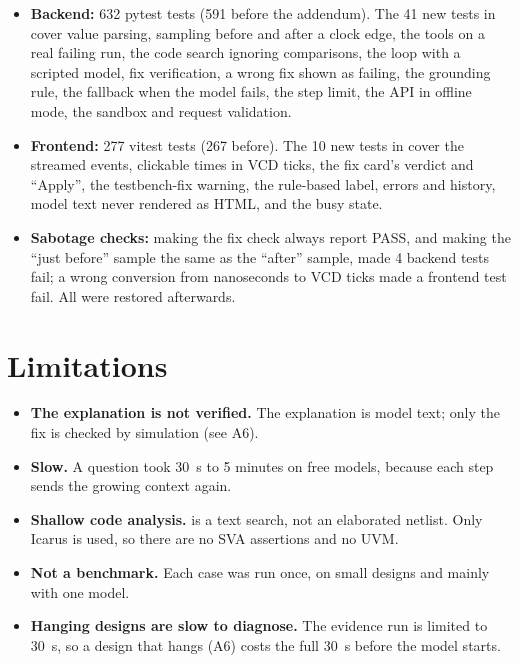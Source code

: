 \begin{itemize}
\item \textbf{Backend:} 632 pytest tests (591 before the addendum). The 41 new tests
in  cover value parsing, sampling before and after a clock
edge, the tools on a real failing run, the code search ignoring comparisons, the loop
with a scripted model, fix verification, a wrong fix shown as failing, the grounding
rule, the fallback when the model fails, the step limit, the API in offline mode, the
sandbox and request validation.
\item \textbf{Frontend:} 277 vitest tests (267 before). The 10 new tests in
 cover the streamed events, clickable times in VCD ticks,
the fix card's verdict and ``Apply'', the testbench-fix warning, the rule-based
label, errors and history, model text never rendered as HTML, and the busy state.
\item \textbf{Sabotage checks:} making the fix check always report PASS, and making
the ``just before'' sample the same as the ``after'' sample, made 4 backend tests
fail; a wrong conversion from nanoseconds to VCD ticks made a frontend test fail. All
were restored afterwards.
\end{itemize}

\section{Limitations}
\label{sec:agentlimits}
\begin{itemize}
\item \textbf{The explanation is not verified.} The explanation is model text; only
the fix is checked by simulation (see A6).
\item \textbf{Slow.} A question took 30~s to 5 minutes on free models, because each
step sends the growing context again.
\item \textbf{Shallow code analysis.}  is a text search, not an
elaborated netlist. Only Icarus is used, so there are no SVA assertions and no UVM.
\item \textbf{Not a benchmark.} Each case was run once, on small designs and mainly
with one model.
\item \textbf{Hanging designs are slow to diagnose.} The evidence run is limited to
30~s, so a design that hangs (A6) costs the full 30~s before the model starts.
\end{itemize}

